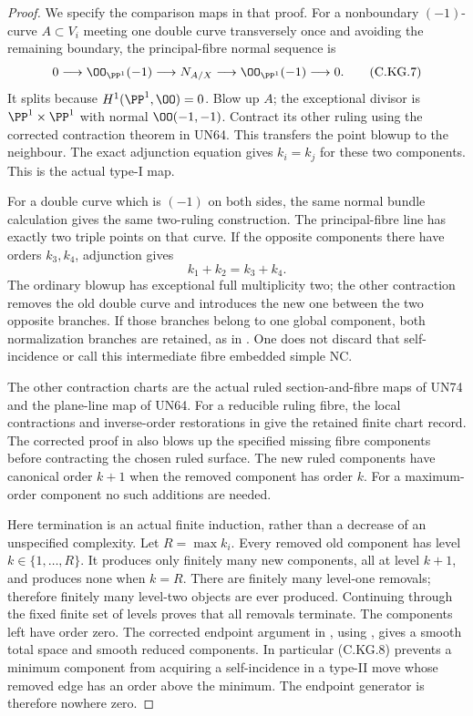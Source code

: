\begin{proof}
We specify the comparison maps in that proof.
For a nonboundary $(-1)$-curve $A\subset V_i$
meeting one double curve transversely once
and avoiding the remaining boundary, the
principal-fibre normal sequence is
\[
 0\longrightarrow\OO_{\PP^1}(-1)
 \longrightarrow N_{A/X}
 \longrightarrow\OO_{\PP^1}(-1)
 \longrightarrow0.
\tag{C.KG.7}
\]
It splits because $H^1(\PP^1,\OO)=0$.
Blow up $A$; the exceptional divisor is
$\PP^1\times\PP^1$ with normal
$\OO(-1,-1)$. Contract its other ruling
using the corrected contraction theorem in
UN64. This transfers the point blowup to
the neighbour. The exact adjunction equation
gives $k_i=k_j$ for these two components.
This is the actual type-I map.

For a double curve which is $(-1)$ on both
sides, the same normal bundle calculation
gives the same two-ruling construction.
The principal-fibre line has exactly two
triple points on that curve. If the opposite
components there have orders $k_3,k_4$,
adjunction gives
\[
                         k_1+k_2=k_3+k_4.
\tag{C.KG.8}
\]
The ordinary blowup has exceptional full
multiplicity two; the other contraction
removes the old double curve and introduces
the new one between the two opposite
branches. If those branches belong to one
global component, both normalization branches
are retained, as in
\cite[\S4.4]{Kulikov1977}. One does not
discard that self-incidence or call this
intermediate fibre embedded simple NC.

The other contraction charts are the actual
ruled section-and-fibre maps of UN74 and
the plane-line map of UN64. For a reducible
ruling fibre, the local contractions and
inverse-order restorations in
\cite[\S\S4.10.7--4.10.9,4.14.5]{Kulikov1977}
give the retained finite chart record.
The corrected proof in
\cite[\S8]{Kulikov1981} also blows up the
specified missing fibre components before
contracting the chosen ruled surface.
The new ruled components have canonical
order $k+1$ when the removed component has
order $k$. For a maximum-order component
no such additions are needed.

Here termination is an actual finite
induction, rather than a decrease of an
unspecified complexity. Let $R=\max k_i$.
Every removed old component has level
$k\in\{1,\ldots,R\}$. It produces only
finitely many new components, all at level
$k+1$, and produces none when $k=R$.
There are finitely many level-one removals;
therefore finitely many level-two objects
are ever produced. Continuing through the
fixed finite set of levels proves that all
removals terminate. The components left
have order zero. The corrected endpoint
argument in \cite[\S10]{Kulikov1981}, using
\cite[\S4.17]{Kulikov1977}, gives a smooth
total space and smooth reduced components.
In particular (C.KG.8) prevents a minimum
component from acquiring a self-incidence
in a type-II move whose removed edge has
an order above the minimum. The endpoint
generator is therefore nowhere zero.


\end{proof}

